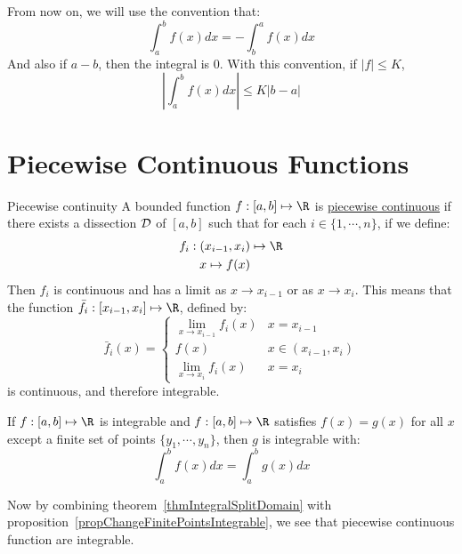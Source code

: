\documentclass[../Main.tex]{subfiles}
\begin{document}
From now on, we will use the convention that:
\begin{equation*}
    \int_a^b f(x) dx = -\int_b^a f(x) dx
\end{equation*}
And also if $a - b$, then the integral is 0. With this convention, if $|f| \leq K$,
\begin{equation*}
    \left|\int_a^b f(x) dx\right| \leq K|b - a|
\end{equation*}
\section{Piecewise Continuous Functions}
\begin{definition}{Piecewise continuity}
    A bounded function $f : [a, b] \mapsto \R$ is \underline{piecewise continuous} if there exists a dissection $\mathcal{D}$ of $[a, b]$ such that for each $i \in \{1, \cdots, n\}$, if we define:
    \begin{align*}
        f_i : (x_{i - 1}, x_i) &\mapsto \R \\
        x \mapsto f(x)
    \end{align*}
    Then $f_i$ is continuous and has a limit as $x \to x_{i - 1}$ or as $x \to x_i$. This means that the function $\bar{f}_i : [x_{i-1}, x_i] \mapsto \R$, defined by:
    \begin{equation*}
        \bar{f}_i(x) =
        \begin{cases}
            \lim_{x \to x_{i - 1}} f_i(x) & x = x_{i - 1} \\
            f(x) & x \in (x_{i - 1}, x_i) \\
            \lim_{x \to x_i} f_i(x) & x = x_i
        \end{cases}
    \end{equation*}
    is continuous, and therefore integrable.
\end{definition}
\begin{proposition}
    If $f : [a, b] \mapsto \R$ is integrable and $f : [a, b] \mapsto \R$ satisfies $f(x) = g(x)$ for all $x$ except a finite set of points $\{y_1, \cdots, y_n\}$, then $g$ is integrable with:
    \begin{equation*}
        \int_a^b f(x) dx = \int_a^b g(x) dx
    \end{equation*}
    \label{propChangeFinitePointsIntegrable}
\end{proposition}
Now by combining theorem~\ref{thmIntegralSplitDomain} with proposition~\ref{propChangeFinitePointsIntegrable}, we see that piecewise continuous function are integrable.
\end{document}
